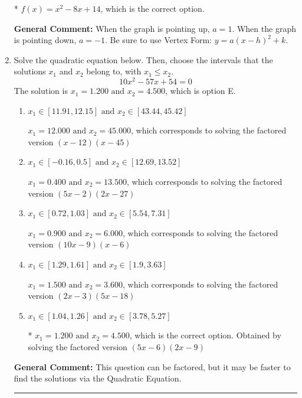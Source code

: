 \documentclass{extbook}[14pt]
\newcommand{\litem}[1]{\item #1

\rule{\textwidth}{0.4pt}}
\begin{document}
\begin{enumerate}
{\begin{enumerate}[label=\Alph*.]
* $f(x)=x^{2} -8 x + 14$, which is the correct option.
\end{enumerate}

\textbf{General Comment:} When the graph is pointing up, $a=1$. When the graph is pointing down, $a=-1$. Be sure to use Vertex Form: $y = a(x-h)^2+k$.
}
\litem{
Solve the quadratic equation below. Then, choose the intervals that the solutions $x_1$ and $x_2$ belong to, with $x_1 \leq x_2$.
\[ 10x^{2} -57 x + 54 = 0 \]
The solution is \( x_1 = 1.200 \text{ and } x_2 = 4.500 \), which is option E.\begin{enumerate}[label=\Alph*.]
\item \( x_1 \in [11.91, 12.15] \text{ and } x_2 \in [43.44, 45.42] \)

$x_1 = 12.000 \text{ and } x_2 = 45.000$, which corresponds to solving the factored version $(x -12)(x -45)$
\item \( x_1 \in [-0.16, 0.5] \text{ and } x_2 \in [12.69, 13.52] \)

$x_1 = 0.400 \text{ and } x_2 = 13.500$, which corresponds to solving the factored version $(5x -2)(2x -27)$
\item \( x_1 \in [0.72, 1.03] \text{ and } x_2 \in [5.54, 7.31] \)

$x_1 = 0.900 \text{ and } x_2 = 6.000$, which corresponds to solving the factored version $(10x -9)(x -6)$
\item \( x_1 \in [1.29, 1.61] \text{ and } x_2 \in [1.9, 3.63] \)

$x_1 = 1.500 \text{ and } x_2 = 3.600$, which corresponds to solving the factored version $(2x -3)(5x -18)$
\item \( x_1 \in [1.04, 1.26] \text{ and } x_2 \in [3.78, 5.27] \)

* $x_1 = 1.200 \text{ and } x_2 = 4.500$, which is the correct option. Obtained by solving the factored version $(5x -6)(2x -9)$
\end{enumerate}

\textbf{General Comment:} This question can be factored, but it may be faster to find the solutions via the Quadratic Equation.
}
\end{enumerate}
\end{document}
